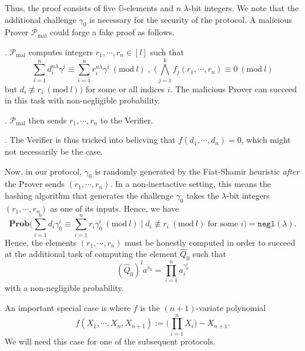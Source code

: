 \documentclass[11pt, lettersize, notitlepage, leqno, footskip=0.6cm]{article}
\newcommand{\pl}{\prod\limits}
\newcommand{\slim}{\sum\limits}
\newcommand{\ttt}{\texttt}
\newcommand{\negl}{\ttt{{negl}}}
\newcommand{\mc}{\mathcal}
\newcommand{\mb}{\mathbb}
\newcommand{\mbf}{\mathbf}
\newcommand{\mr}{\mathrm}
\newcommand{\lam}{\lambda}
\newcommand{\what}{\widehat}
\newcommand{\Prob}{\mbf{Prob}}
\newcommand{\mP}{\mc{P}}
\newcommand{\vs}{\vspace{-0.15cm}}
\newcommand{\noin}{\noindent}
\newcommand{\Mod}[1]{\ (\mathrm{mod}\ #1)}
\numberwithin{equation}{section}
\begin{document}
\vspace{0.1cm}

Thus, the proof consists of five $\mb{G}$-elements and $n$ $\lam$-bit integers. We note that the additional challenge $\gamma_0$ is necessary for the security of the protocol. A malicious Prover $\mP_{\mr{mal}}$ could forge a fake proof as follows.

\noin 1. $\mP_{\mr{mal}}$ computes integers $r_1,\cdots,r_n\in[l]$ such that \vs $$ \slim_{i=1}^n d_i^{n\lam}\gamma^i\equiv\slim_{i=1}^n r_i^{n\lam}\gamma^i\Mod{l} \;,\;\Big( \bigwedge\limits_{j=1}^k f_j(r_1,\cdots,r_n) \equiv 0\Mod{l}$$ but $d_i\not\equiv r_i\Mod{l}\Big)$ for some or all indices $i$. The malicious Prover can succeed in this task with non-negligible probability.

\noin 2. $\mP_{\mr{mal}}$ then sends $r_1,\cdots,r_n$ to the Verifier.

\noin 3. The Verifier is thus tricked into believing that $f(d_1,\cdots,d_n) = 0$, which might not necessarily be the case.

Now, in our protocol, $\gamma_0$ is randomly generated by the Fiat-Shamir heuristic \textit{after} the Prover sends $(r_1,\cdots,r_n)$. In a non-inertactive setting, this means the hashing algorithm that generates the challenge $\gamma_0$ takes the $\lam$-bit integers $(r_1,\cdots,r_n)$ as one of its inputs. Hence, we have \vs $$\Prob\Big(\slim_{i=1}^n d_i\gamma_0^i \equiv \slim_{i=1}^n r_i\gamma_0^i \Mod{l}\;\Big|\; d_i\not\equiv r_i\Mod{l}\;\text{for some } i\Big) = \negl(\lam). $$ Hence, the elements $(r_1,\cdots,r_n)$ must be honestly computed in order to succeed at the additional task of computing the element $\what{Q}_0$ such that \vs $$(\what{Q}_0)^la^{\what{r}_0} = \pl_{i=1}^{n} a_i^{\gamma_0^i} $$ with a non-negligible probability.

\begin{comment} Although the proof is linear in size because of the $\lam$-bit integers $r_1,\cdots,r_n$, the number of $\mb{G}$-elements in this proof is constant. Since the group elements are much larger than $\lam$-bits, the communication complexity is substantially smaller that sending over $n$ separate arguments of knowledge. For instance, when $\lam = 128$, the group elements are of bit-size $3072$ with a RSA group, $6656$-bits with an imaginary quadratic class group and $3300$-bits with a Jacobian of a genus three hyperelliptic curve.\end{comment}

An important special case is where $f$ is the $(n+1)$-variate polynomial \vs $$f(X_1,\cdots,X_n, X_{n+1}) := \big(\pl_{i=1}^n X_i \big)- X_{n+1}.$$ We will need this case for one of the subsequent protocols. \vspace{0.2cm}
\end{document}
